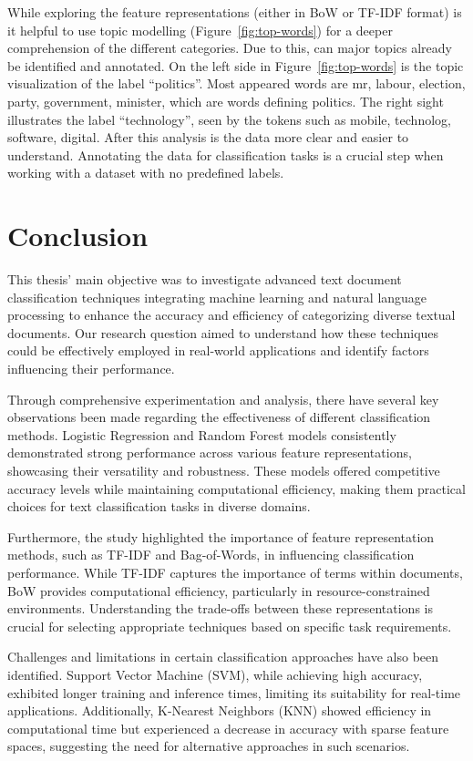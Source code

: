 While exploring the feature representations (either in BoW or TF-IDF format) is it helpful to use topic modelling (Figure~\ref{fig:top-words}) for a deeper comprehension of the different categories. Due to this, can major topics already be identified and annotated. On the left side in Figure~\ref{fig:top-words} is the topic visualization of the label “politics”. Most appeared words are mr, labour, election, party, government, minister, which are words defining politics. The right sight illustrates the label “technology”, seen by the tokens such as mobile, technolog, software, digital. After this analysis is the data more clear and easier to understand. Annotating the data for classification tasks is a crucial step when working with a dataset with no predefined labels.

\section{Conclusion}

This thesis' main objective was to investigate advanced text document classification techniques integrating machine learning and natural language processing to enhance the accuracy and efficiency of categorizing diverse textual documents. Our research question aimed to understand how these techniques could be effectively employed in real-world applications and identify factors influencing their performance.

Through comprehensive experimentation and analysis, there have several key observations been made regarding the effectiveness of different classification methods. Logistic Regression and Random Forest models consistently demonstrated strong performance across various feature representations, showcasing their versatility and robustness. These models offered competitive accuracy levels while maintaining computational efficiency, making them practical choices for text classification tasks in diverse domains.

Furthermore, the study highlighted the importance of feature representation methods, such as TF-IDF and Bag-of-Words, in influencing classification performance. While TF-IDF captures the importance of terms within documents, BoW provides computational efficiency, particularly in resource-constrained environments. Understanding the trade-offs between these representations is crucial for selecting appropriate techniques based on specific task requirements.

Challenges and limitations in certain classification approaches have also been identified. Support Vector Machine (SVM), while achieving high accuracy, exhibited longer training and inference times, limiting its suitability for real-time applications. Additionally, K-Nearest Neighbors (KNN) showed efficiency in computational time but experienced a decrease in accuracy with sparse feature spaces, suggesting the need for alternative approaches in such scenarios.

